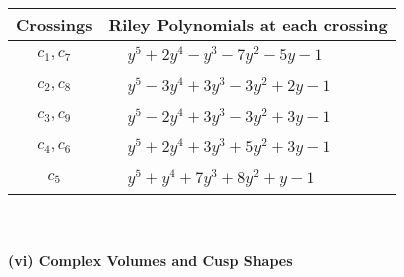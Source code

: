 \documentclass[1p]{elsarticle_modified}
\theoremstyle{definition}
\begin{document}
\begin{tabular}{m{50pt}|m{274pt}}
Crossings & \hspace{64pt}Riley Polynomials at each crossing \\
\hline $$\begin{aligned}c_{1},c_{7}\end{aligned}$$&$\begin{aligned}
&y^5+2 y^4- y^3-7 y^2-5 y-1
\end{aligned}$\\
\hline $$\begin{aligned}c_{2},c_{8}\end{aligned}$$&$\begin{aligned}
&y^5-3 y^4+3 y^3-3 y^2+2 y-1
\end{aligned}$\\
\hline $$\begin{aligned}c_{3},c_{9}\end{aligned}$$&$\begin{aligned}
&y^5-2 y^4+3 y^3-3 y^2+3 y-1
\end{aligned}$\\
\hline $$\begin{aligned}c_{4},c_{6}\end{aligned}$$&$\begin{aligned}
&y^5+2 y^4+3 y^3+5 y^2+3 y-1
\end{aligned}$\\
\hline $$\begin{aligned}c_{5}\end{aligned}$$&$\begin{aligned}
&y^5+y^4+7 y^3+8 y^2+y-1
\end{aligned}$\\
\hline
\end{tabular}\\~\\
\newpage\flushleft \textbf{(vi) Complex Volumes and Cusp Shapes}
\end{document}
